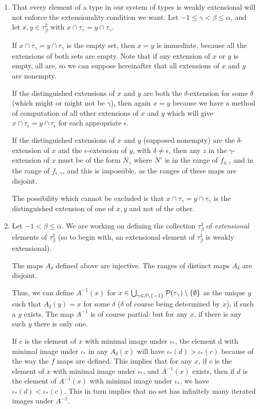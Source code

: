 \documentclass[12pt]{article}
\begin{document}
\begin{enumerate}
\item  That every element of a type in our system of types is weakly extensional will not enforce the extensionality condition we want.  Let $-1 \leq \gamma < \beta \leq \alpha$, and let
$x,y \in \tau^2_\beta$ with $x \cap \tau_\gamma = y \cap \tau_\gamma$.   

If $x \cap \tau_\gamma = y \cap \tau_\gamma$ is the empty set, then $x=y$ is immediate, because all the extensions of both sets are empty.  Note that if any extension
of $x$ or $y$ is empty, all are, so we can suppose hereinafter that all extensions of $x$ and $y$ are nonempty.

If the distinguished extensions of $x$ and $y$ are both the $\delta$-extension for some $\delta$ (which might or might not be $\gamma$), then again $x=y$ because we have a method of computation of all other extensions of $x$ and $y$ which will give $x \cap \tau_\epsilon = y \cap \tau_\epsilon$ for each appropriate $\epsilon$. 

If the distinguished extensions of $x$ and $y$ (supposed nonempty) are the $\delta$-extension of $x$ and the $\epsilon$-extension of $y$, with $\delta \neq \epsilon$, then any $z$ in the $\gamma$-extension of $x$ must be of the form $N_\gamma$ where $N^\circ$ is in the range of $f_{\delta,\gamma}$ and in the range of $f_{\epsilon,\gamma}$, and this is impossible, as the ranges of these maps are disjoint.

The possibility which cannot be excluded is that $x \cap \tau_\gamma = y \cap \tau_\gamma$ is the distinguished extension of one of $x,y$ and not of the other.

\item  Let $-1 < \beta \leq \alpha$.  We are working on defining the collection $\tau_\beta^3$ of {\em extensional\/} elements of $\tau^2_\beta$ (so to begin with,
an extensional element of $\tau^1_\beta$ is weakly extensional).

The maps $A_\delta$ defined above are injective.  The ranges of distinct maps $A_\delta$ are disjoint.  

Thus, we can define $A^{-1}(x)$ for $x \in \bigcup_{\gamma \in \beta\setminus \{-1\}} {\cal P} (\tau_\gamma) \setminus \{\emptyset\}$ as the unique $y$ such that $A_{\delta}(y)=x$ for some $\delta$ ($\delta$ of course being determined by $x$), if such a $y$ exists.  The map $A^{-1}$ is of course partial:  but for any $x$, if there is any such $y$ there is only one.

If $c$ is the element of $x$ with minimal image under $\iota_*$, the element d with minimal image under $\iota_*$ in any $A_\delta(x)$ will have $\iota_*(d) > \iota_*(c)$ because
of the way the $f$ maps are defined.  This implies that for any $x$, if $c$ is the element of $x$ with minimal image under $\iota_*$, and $A^{-1}(x)$ exists, then if
$d$ is the element of $A^{-1}(x)$ with minimal image under $\iota_*$, we have $\iota_*(d) < \iota_*(c)$.  This in turn implies that no set has infinitely many iterated images
under $A^{-1}$.


\end{enumerate}
\end{document}
